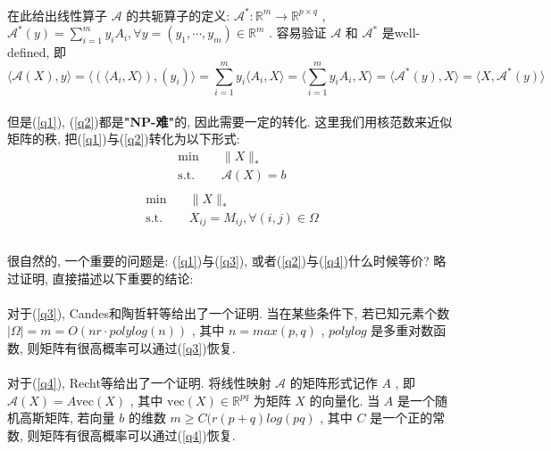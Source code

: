 \documentclass[UTF8]{ctexart}
\renewcommand{\b}{\textbf}
\newcommand{\equSplit}[1]{\begin{equation}\begin{split}#1\end{split}\end{equation}}
\newcommand{\Tst}{\text{s.t.}\quad}
\newcommand{\abs}[1]{\lvert#1\rvert}
\newcommand{\norm}[1]{\lVert#1\rVert}
\newcommand{\inprod}[1]{\langle#1\rangle}
\newcommand{\Real}[1]{\mathbb{R}^{#1}}
\newcommand{\nunorm}{\norm{X}_*}
\newcommand{\Ma}{\mathcal{A}}
\numberwithin{equation}{section}
\begin{document}
			\paragraph{}
				\quad 在此给出线性算子 $\Ma$ 的共轭算子的定义:
				$\Ma^*: \Real{m} \rightarrow \Real{p \times q}$ ,
				$\Ma^*(y) = \sum^m_{i = 1}y_i A_i, \forall y = (y_1, \cdots, y_m) \in \Real{m}$ .
				容易验证 $\Ma$ 和 $\Ma^*$ 是well-defined, 即
				\[
					\inprod{\Ma(X), y}=\inprod{(\inprod{A_i, X}), (y_i)} = 
					\sum^m_{i = 1}y_i \inprod{A_i, X} = \inprod{\sum^m_{i = 1}y_i A_i, X}
					= \inprod{\Ma^*(y), X} = \inprod{X, \Ma^*(y)}
				\]

			\paragraph{}
				\quad 但是(\ref{q1}), (\ref{q2})都是\b{"NP-难"}的, 因此需要一定的转化. 这里我们用核范数来近似矩阵的秩, 把(\ref{q1})与(\ref{q2})转化为以下形式:
				\equSplit{\label{q3}
					\min \quad & \nunorm\\
					\Tst & \mathcal{A}(X)=b\\	
				}
				\equSplit{\label{q4}
					\min \quad & \nunorm\\
					\Tst & X_{ij}=M_{ij},\forall(i,j)\in\Omega\\
				}

			\paragraph{}
				\quad 很自然的, 一个重要的问题是: (\ref{q1})与(\ref{q3}), 或者(\ref{q2})与(\ref{q4})什么时候等价? 略过证明, 直接描述以下重要的结论:

			\paragraph{}
				\quad 对于(\ref{q3}), Candes和陶哲轩等给出了一个证明. 当在某些条件下, 若已知元素个数 $\abs{\Omega} = m = O(nr \cdot polylog(n))$ , 其中 $n=max(p,q)$ , $polylog$ 是多重对数函数, 则矩阵有很高概率可以通过(\ref{q3})恢复.

			\paragraph{}
				\quad 对于(\ref{q4}), Recht等给出了一个证明. 将线性映射 $\mathcal{A}$ 的矩阵形式记作 $A$ , 即 $\mathcal{A}(X) = A\text{vec}(X)$ , 其中 $\text{vec}(X) \in \Real{pq}$ 为矩阵 $X$ 的向量化. 当 $A$ 是一个随机高斯矩阵, 若向量 $b$ 的维数 $m \ge C(r(p + q)log(pq)$ , 其中 $C$ 是一个正的常数, 则矩阵有很高概率可以通过(\ref{q4})恢复.
\end{document}
